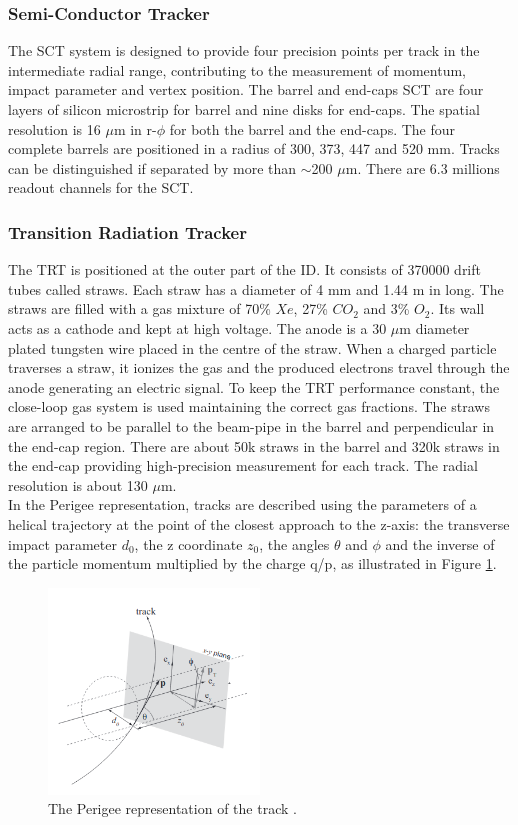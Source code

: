 \subsubsection{Semi-Conductor Tracker}
\label{chap2:ATLAS:ITK:SCT}
The SCT system is designed to provide four precision points per track in the intermediate radial range, contributing to the measurement of momentum, impact parameter and vertex position. The barrel and end-caps SCT are four layers of silicon microstrip for barrel and nine disks for end-caps. The spatial resolution is 16 $\mu$m in r-$\phi$ for both the barrel and the end-caps. The four complete barrels are positioned in a radius of 300, 373, 447 and 520 mm. Tracks can be distinguished if separated by more than $\sim$200 $\mu$m. There are 6.3 millions readout channels for the SCT.

\subsubsection{Transition Radiation Tracker}
The TRT is positioned at the outer part of the ID. It consists of 370000 drift tubes called straws. Each straw has a diameter of 4 mm and 1.44 m in long. The straws are filled with a gas mixture of 70\% $Xe$, 27\% $CO_2$ and 3\% $O_2$. Its wall acts as a cathode and kept at high voltage. The anode is a 30 $\mu$m diameter plated tungsten wire placed in the centre of the straw. When a charged particle traverses a straw, it ionizes the gas and the produced electrons travel through the anode generating an electric signal. To keep the TRT performance constant, the close-loop gas system is used maintaining the correct gas fractions. The straws are arranged to be parallel to the beam-pipe in the barrel and perpendicular in the end-cap region. There are about 50k straws in the barrel and 320k straws in the end-cap providing high-precision measurement for each track. The radial resolution is about 130 $\mu$m. \\
In the Perigee representation, tracks are described using the parameters of a helical trajectory at the point of the closest approach to the z-axis: the transverse impact parameter $d_0$, the z coordinate $z_0$, the angles $\theta$ and $\phi$ and the inverse of the particle momentum multiplied by the charge q/p, as illustrated in Figure \ref{fig:chap2:ATLAS:ITK:Trk}. \\
\begin{figure}[htbp]
    \centering
    \includegraphics[width=0.5\textwidth]{Ch2/Img/Track.png}
    \caption{The Perigee representation of the track \cite{Track_schema}.}
    \label{fig:chap2:ATLAS:ITK:Trk}
\end{figure}

